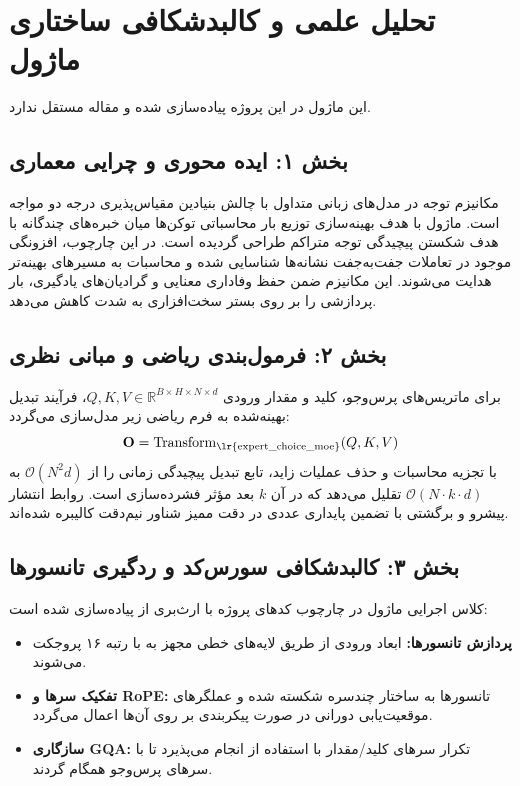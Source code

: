 \section{تحلیل علمی و کالبدشکافی ساختاری ماژول }

این ماژول در این پروژه پیاده‌سازی شده و مقاله مستقل ندارد.
\label{sec:expert_choice_moe}

\subsection*{بخش ۱: ایده محوری و چرایی معماری }
مکانیزم توجه در مدل‌های زبانی متداول با چالش بنیادین مقیاس‌پذیری درجه دو مواجه است. ماژول  با هدف بهینه‌سازی توزیع بار محاسباتی توکن‌ها میان خبره‌های چندگانه با هدف شکستن پیچیدگی توجه متراکم طراحی گردیده است. در این چارچوب، افزونگی موجود در تعاملات جفت‌به‌جفت نشانه‌ها شناسایی شده و محاسبات به مسیرهای بهینه‌تر هدایت می‌شوند. این مکانیزم ضمن حفظ وفاداری معنایی و گرادیان‌های یادگیری، بار پردازشی را بر روی بستر سخت‌افزاری به شدت کاهش می‌دهد.

\subsection*{بخش ۲: فرمول‌بندی ریاضی و مبانی نظری }
برای ماتریس‌های پرس‌وجو، کلید و مقدار ورودی $Q, K, V \in \mathbb{R}^{B \times H \times N \times d}$، فرآیند تبدیل بهینه‌شده به فرم ریاضی زیر مدل‌سازی می‌گردد:
\begin{equation}
\mathbf{O} = \operatorname{Transform}_{\text{\lr{expert\_choice\_moe}}}(Q, K, V)
\end{equation}
با تجزیه محاسبات و حذف عملیات زاید، تابع تبدیل پیچیدگی زمانی را از $\mathcal{O}(N^2 d)$ به $\mathcal{O}(N \cdot k \cdot d)$ تقلیل می‌دهد که در آن $k$ بعد مؤثر فشرده‌سازی است. روابط انتشار پیشرو و برگشتی با تضمین پایداری عددی در دقت ممیز شناور نیم‌دقت  کالیبره شده‌اند.

\subsection*{بخش ۳: کالبدشکافی سورس‌کد و ردگیری تانسورها }
کلاس اجرایی ماژول در چارچوب کدهای پروژه با ارث‌بری از  پیاده‌سازی شده است:
\begin{itemize}
    \item \textbf{پردازش تانسورها:} ابعاد ورودی \lr{$[B, N, D]$} از طریق لایه‌های خطی مجهز به  با رتبه ۱۶ پروجکت می‌شوند.
    \item \textbf{تفکیک سرها و RoPE:} تانسورها به ساختار چندسره \lr{$[B, H, N, d]$} شکسته شده و عملگرهای موقعیت‌یابی دورانی در صورت پیکربندی بر روی آن‌ها اعمال می‌گردد.
    \item \textbf{سازگاری GQA:} تکرار سرهای کلید/مقدار با استفاده از  انجام می‌پذیرد تا با سرهای پرس‌وجو همگام گردند.
\end{itemize}

